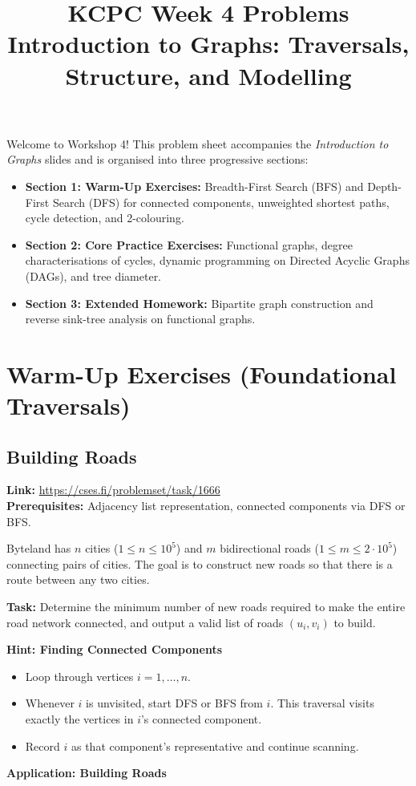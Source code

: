 \documentclass[12pt]{article}
\title{KCPC Week 4 Problems\\Introduction to Graphs: Traversals, Structure, and Modelling}
\author{}
\date{}
\begin{document}
\maketitle
\thispagestyle{fancy}

\noindent
Welcome to Workshop 4! This problem sheet accompanies the \textit{Introduction to Graphs} slides and is organised into three progressive sections:
\begin{itemize}
    \item \textbf{Section 1: Warm-Up Exercises:} Breadth-First Search (BFS) and Depth-First Search (DFS) for connected components, unweighted shortest paths, cycle detection, and 2-colouring.
    \item \textbf{Section 2: Core Practice Exercises:} Functional graphs, degree characterisations of cycles, dynamic programming on Directed Acyclic Graphs (DAGs), and tree diameter.
    \item \textbf{Section 3: Extended Homework:} Bipartite graph construction and reverse sink-tree analysis on functional graphs.
\end{itemize}

\section{Warm-Up Exercises (Foundational Traversals)}

\subsection{Building Roads}
\textbf{Link:} \url{https://cses.fi/problemset/task/1666} \\
\textbf{Prerequisites:} Adjacency list representation, connected components via DFS or BFS.

Byteland has $n$ cities ($1 \le n \le 10^5$) and $m$ bidirectional roads ($1 \le m \le 2 \cdot 10^5$) connecting pairs of cities. The goal is to construct new roads so that there is a route between any two cities.

\textbf{Task:} Determine the minimum number of new roads required to make the entire road network connected, and output a valid list of roads $(u_i, v_i)$ to build.

\textbf{Hint: Finding Connected Components}
\begin{itemize}
    \item Loop through vertices $i = 1, \dots, n$.
    \item Whenever $i$ is unvisited, start DFS or BFS from $i$. This traversal visits exactly the vertices in $i$'s connected component.
    \item Record $i$ as that component's representative and continue scanning.
\end{itemize}
\textbf{Application: Building Roads}
\end{document}
